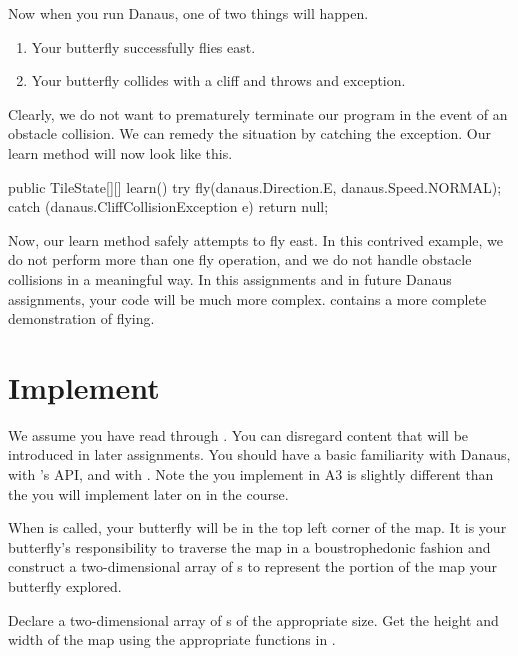 \documentclass{pset}
\newcommand{\athree}{A3}
\newcommand{\abutt}{\java{AbstractButterfly}}
\begin{document}
Now when you run Danaus, one of two things will happen.
\begin{enumerate}
  \item Your butterfly successfully flies east.
  \item Your butterfly collides with a cliff and throws and exception.
\end{enumerate}

Clearly, we do not want to prematurely terminate our program in the event of an
obstacle collision. We can remedy the situation by catching the exception. Our
learn method will now look like this.

\begin{Java}
public TileState[][] learn() {
	try {
		fly(danaus.Direction.E, danaus.Speed.NORMAL);
	}
	catch (danaus.CliffCollisionException e) {}
	return null;
}
\end{Java}

Now, our learn method safely attempts to fly east. In this contrived example,
we do not perform more than one fly operation, and we do not handle obstacle
collisions in a meaningful way. In this assignments and in future Danaus
assignments, your code will be much more complex.
 contains a more complete demonstration of
flying.

\part{Implement }
We assume you have read through . You can disregard
content that will be introduced in later assignments. You should have a basic
familiarity with Danaus, with 's API, and with
. Note the  you implement in \athree{} is slightly
different than the  you will implement later on in the course.

When  is called, your butterfly will be in the top left corner of
the map. It is your butterfly's responsibility to traverse the map in a
boustrophedonic fashion and construct a two-dimensional array of
s to represent the portion of the map your butterfly explored.

Declare a two-dimensional array of s of the appropriate size.
Get the height and width of the map using the appropriate functions in
\abutt{}.  
\end{document}
